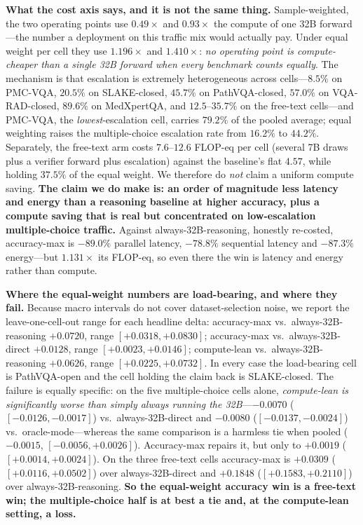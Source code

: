 \documentclass[conference]{IEEEtran}
\begin{document}
\textbf{What the cost axis says, and it is not the same thing.} Sample-weighted, the two operating points use $0.49{\times}$ and $0.93{\times}$ the compute of one 32B forward---the number a deployment on this traffic mix would actually pay. Under equal weight per cell they use $1.196{\times}$ and $1.410{\times}$: \emph{no operating point is compute-cheaper than a single 32B forward when every benchmark counts equally}. The mechanism is that escalation is extremely heterogeneous across cells---$8.5\%$ on PMC-VQA, $20.5\%$ on SLAKE-closed, $45.7\%$ on PathVQA-closed, $57.0\%$ on VQA-RAD-closed, $89.6\%$ on MedXpertQA, and $12.5$--$35.7\%$ on the free-text cells---and PMC-VQA, the \emph{lowest}-escalation cell, carries $79.2\%$ of the pooled average; equal weighting raises the multiple-choice escalation rate from $16.2\%$ to $44.2\%$. Separately, the free-text arm costs $7.6$--$12.6$ FLOP-eq per cell (several 7B draws plus a verifier forward plus escalation) against the baseline's flat $4.57$, while holding $37.5\%$ of the equal weight. We therefore do \emph{not} claim a uniform compute saving. \textbf{The claim we do make is: an order of magnitude less latency and energy than a reasoning baseline at higher accuracy, plus a compute saving that is real but concentrated on low-escalation multiple-choice traffic.} Against always-32B-reasoning, honestly re-costed, accuracy-max is $-89.0\%$ parallel latency, $-78.8\%$ sequential latency and $-87.3\%$ energy---but $1.131{\times}$ its FLOP-eq, so even there the win is latency and energy rather than compute.

\textbf{Where the equal-weight numbers are load-bearing, and where they fail.} Because macro intervals do not cover dataset-selection noise, we report the leave-one-cell-out range for each headline delta: accuracy-max vs.\ always-32B-reasoning $+0.0720$, range $[+0.0318,+0.0830]$; accuracy-max vs.\ always-32B-direct $+0.0128$, range $[+0.0023,+0.0146]$; compute-lean vs.\ always-32B-reasoning $+0.0626$, range $[+0.0225,+0.0732]$. In every case the load-bearing cell is PathVQA-open and the cell holding the claim back is SLAKE-closed. The failure is equally specific: on the five multiple-choice cells alone, \emph{compute-lean is significantly worse than simply always running the 32B}---$-0.0070$ ($[-0.0126,-0.0017]$) vs.\ always-32B-direct and $-0.0080$ ($[-0.0137,-0.0024]$) vs.\ oracle-mode---whereas the same comparison is a harmless tie when pooled ($-0.0015$, $[-0.0056,+0.0026]$). Accuracy-max repairs it, but only to $+0.0019$ ($[+0.0014,+0.0024]$). On the three free-text cells accuracy-max is $+0.0309$ ($[+0.0116,+0.0502]$) over always-32B-direct and $+0.1848$ ($[+0.1583,+0.2110]$) over always-32B-reasoning. \textbf{So the equal-weight accuracy win is a free-text win; the multiple-choice half is at best a tie and, at the compute-lean setting, a loss.}
\end{document}
